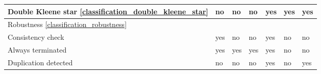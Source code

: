 \begin{center}
\begin{tabular}{| l | l | l | l | l | l | l |}
    Double Kleene star \ref{classification_double_kleene_star} & no & no & no & yes & yes & yes \\ \hline
        
    \hline
	\multicolumn{7}{|l|}{Robustness \ref{classification_robustness}} \\ \hline
    Consistency check & yes & no & no & yes & no & no \\ \hline
    Always terminated & yes & yes & yes & yes & no & no \\ \hline  
    Duplication detected & no & no & no & yes & no & yes \\  \hline
  \end{tabular}
  \end{center}